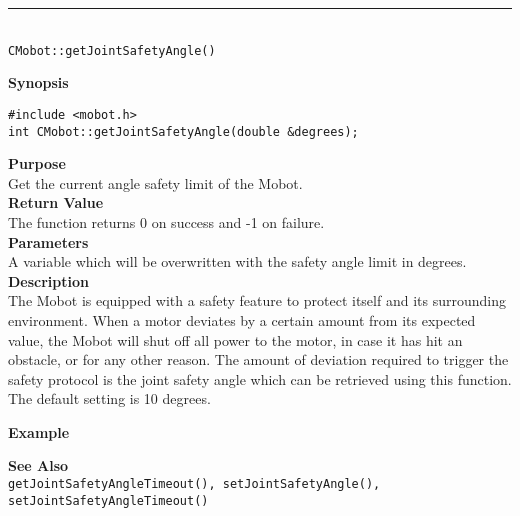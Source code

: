 \noindent
\vspace{5pt}
\rule{4.5in}{0.015in}\\
\noindent
{\LARGE \texttt{CMobot::getJointSafetyAngle()}}\\
{}

\noindent
{\bf Synopsis}
\vspace{-8pt}
\begin{verbatim}
#include <mobot.h>
int CMobot::getJointSafetyAngle(double &degrees);
\end{verbatim}

\noindent
{\bf Purpose}\\
Get the current angle safety limit of the Mobot.\\

\noindent
{\bf Return Value}\\
The function returns 0 on success and -1 on failure.\\

\noindent
{\bf Parameters}\\
A variable which will be overwritten with the safety angle limit in degrees.\\

\noindent
{\bf Description}\\
The Mobot is equipped with a safety feature to protect itself and its surrounding
environment. When a motor deviates by a certain amount from its expected value, 
the Mobot will shut off all power to the motor, in case it has hit an obstacle,
or for any other reason. The amount of deviation required to trigger the safety
protocol is the joint safety angle which can be retrieved using this function.
The default setting is 10 degrees.

\noindent
{\bf Example}\\
\noindent

\noindent
{\bf See Also}\\
\texttt{getJointSafetyAngleTimeout(), setJointSafetyAngle(), setJointSafetyAngleTimeout()}\\

